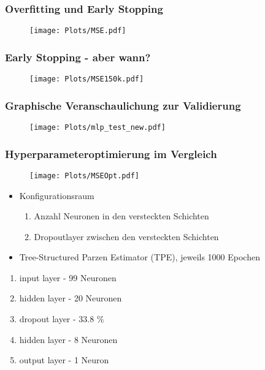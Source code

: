 \begin{frame}
  \frametitle{Overfitting und Early Stopping}
  \begin{figure}
    \centering
    \texttt{[image: Plots/MSE.pdf]}
  \end{figure}
\end{frame}

\begin{frame}
  \frametitle{Early Stopping - aber wann?}
  \begin{figure}
    \centering
    \texttt{[image: Plots/MSE150k.pdf]}
  \end{figure}
\end{frame}

\begin{frame}
  \frametitle{Graphische Veranschaulichung zur Validierung}
  \begin{figure}
    \centering
    \texttt{[image: Plots/mlp\_test\_new.pdf]}
  \end{figure}
\end{frame}

\begin{frame}
  \frametitle{Hyperparameteroptimierung im Vergleich}
  \begin{minipage}{0.5\textwidth}
    \begin{figure}
      \centering
      \texttt{[image: Plots/MSEOpt.pdf]}
    \end{figure}
  \end{minipage}%
  \hfill%
  \begin{minipage}{0.5\textwidth}
      \begin{itemize}
        \item Konfigurationsraum \\
        \begin{enumerate}
          \item Anzahl Neuronen in den versteckten Schichten
          \item Dropoutlayer zwischen den versteckten Schichten
        \end{enumerate}
        \item Tree-Structured Parzen Estimator (TPE), jeweils 1000 Epochen
      \end{itemize}
  \end{minipage}
  \begin{minipage}{\textwidth}
     \begin{enumerate}
       \item input layer - 99 Neuronen
       \item hidden layer - 20 Neuronen
       \item dropout layer - 33.8 \%
       \item hidden layer - 8 Neuronen
       \item output layer - 1 Neuron
     \end{enumerate}
  \end{minipage}

\end{frame}

